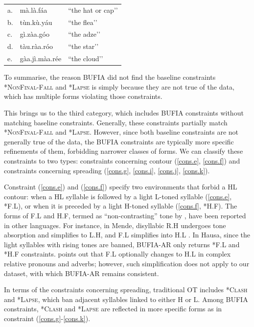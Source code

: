 \begin{tabular}{@{}l@{\hspace{0.8em}}l@{\hspace{1em}}l@{}}
	a.  & mà.là.fáa      & ``the hat or cap’’ \\
	b.  & tùn.kù.yáu     & ``the flea’’ \\
	c.  & gì.zàa.góo     & ``the adze’’ \\
	d.  & tàu.ràa.róo    & ``the star’’ \\
	e.  & gàa.jì.màa.rée & ``the cloud’’ \\
\end{tabular}
\xe

To summarise, the reason BUFIA did not find the baseline constraints
\textsc{*NonFinal-Fall} and \textsc{*Lapse} is simply because they are
not true of the data, which has multiple forms violating those
constraints.

This brings us to the third category, which includes BUFIA constraints
without matching baseline constraints. Generally, these constraints
partially match \textsc{*NonFinal-Fall} and \textsc{*Lapse}. However,
since both baseline constraints are not generally true of the data,
the BUFIA constraints are typically more specific refinements of them,
forbidding narrower classes of forms. We can classify these constraints
to two types: constraints concerning contour (\ref{cons.e}, \ref{cons.f})
and constraints concerning spreading (\ref{cons.g}, \ref{cons.i},
\ref{cons.j}, \ref{cons.k}).

Constraint (\ref{cons.e}) and (\ref{cons.f}) specify two environments that forbid 
a HL contour: when a HL syllable is followed by a light L-toned syllable 
(\ref{cons.e}, *F.L), or when it is preceded by a light H-toned syllable 
(\ref{cons.f}, *H.F). The forms of F.L and H.F, termed as ``non-contrasting'' 
tone by \citet{zoll2003optimal}, have been reported in other languages. 
For instance, in Mende, disyllabic R.H undergoes tone absorption and
simplifies to L.H, and F.L simplifies into H.L \citep{leben2017tone}. 
In Hausa, since the light syllables with rising tones are banned, BUFIA-AR 
only returns *F.L and *H.F constraints. \citet[p.598]{Newmanbook} 
points out that F.L optionally changes to H.L in complex relative pronouns 
and adverbs; however, such simplification does not apply to our dataset, 
with which BUFIA-AR remains consistent.

In terms of the constraints concerning spreading, traditional OT includes 
\textsc{*Clash} and \textsc{*Lapse}, which ban adjacent syllables linked 
to either H or L. Among BUFIA constraints, \textsc{*Clash } and \textsc{*Lapse} 
are reflected in more specific forms as in constraint (\ref{cons.g}-\ref{cons.k}).

